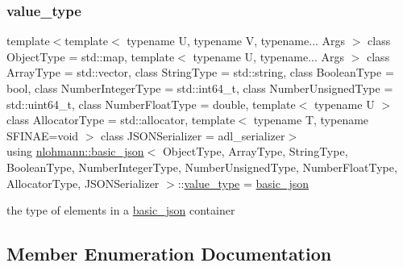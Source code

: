 \subsubsection{\texorpdfstring{value\_type}{value\_type}}
{\footnotesize\ttfamily template$<$template$<$ typename U, typename V, typename... Args $>$ class Object\+Type = std\+::map, template$<$ typename U, typename... Args $>$ class Array\+Type = std\+::vector, class String\+Type  = std\+::string, class Boolean\+Type  = bool, class Number\+Integer\+Type  = std\+::int64\+\_\+t, class Number\+Unsigned\+Type  = std\+::uint64\+\_\+t, class Number\+Float\+Type  = double, template$<$ typename U $>$ class Allocator\+Type = std\+::allocator, template$<$ typename T, typename S\+F\+I\+N\+A\+E=void $>$ class J\+S\+O\+N\+Serializer = adl\+\_\+serializer$>$ \\
using \mbox{\hyperlink{classnlohmann_1_1basic__json}{nlohmann\+::basic\+\_\+json}}$<$ Object\+Type, Array\+Type, String\+Type, Boolean\+Type, Number\+Integer\+Type, Number\+Unsigned\+Type, Number\+Float\+Type, Allocator\+Type, J\+S\+O\+N\+Serializer $>$\+::\mbox{\hyperlink{classnlohmann_1_1basic__json_a2b3297873b70c080837e8eedc4fec32f}{value\+\_\+type}} =  \mbox{\hyperlink{classnlohmann_1_1basic__json}{basic\+\_\+json}}}



the type of elements in a \mbox{\hyperlink{classnlohmann_1_1basic__json}{basic\+\_\+json}} container 



\subsection{Member Enumeration Documentation}
\mbox{\label{classnlohmann_1_1basic__json_aea1c863b719b4ca5b77188c171bbfafe}} 
